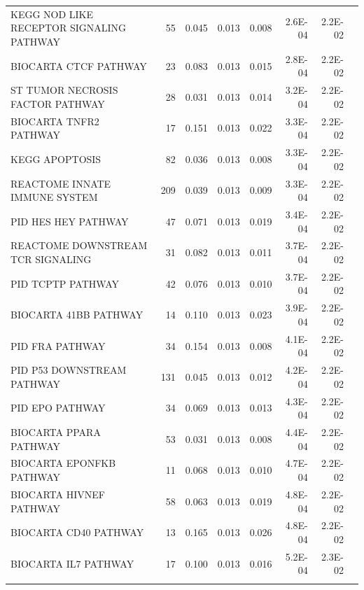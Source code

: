 \documentclass[a4,center,fleqn]{NAR}
\begin{document}
\begin{table}[!ht]
\begin{tabular}{p{3in}rrrrrrr}
			KEGG NOD LIKE RECEPTOR SIGNALING PATHWAY & 55 & 0.045 & 0.013 & 0.008 & 2.6E-04 & 2.2E-02 &  \\ 
			BIOCARTA CTCF PATHWAY & 23 & 0.083 & 0.013 & 0.015 & 2.8E-04 & 2.2E-02 &  \\ 
			ST TUMOR NECROSIS FACTOR PATHWAY & 28 & 0.031 & 0.013 & 0.014 & 3.2E-04 & 2.2E-02 &  \\ 
			BIOCARTA TNFR2 PATHWAY & 17 & 0.151 & 0.013 & 0.022 & 3.3E-04 & 2.2E-02 &  \\ 
			KEGG APOPTOSIS & 82 & 0.036 & 0.013 & 0.008 & 3.3E-04 & 2.2E-02 &  \\ 
			REACTOME INNATE IMMUNE SYSTEM & 209 & 0.039 & 0.013 & 0.009 & 3.3E-04 & 2.2E-02 &  \\ 
			PID HES HEY PATHWAY & 47 & 0.071 & 0.013 & 0.019 & 3.4E-04 & 2.2E-02 &  \\ 
			REACTOME DOWNSTREAM TCR SIGNALING & 31 & 0.082 & 0.013 & 0.011 & 3.7E-04 & 2.2E-02 &  \\ 
			PID TCPTP PATHWAY & 42 & 0.076 & 0.013 & 0.010 & 3.7E-04 & 2.2E-02 &  \\ 
			BIOCARTA 41BB PATHWAY & 14 & 0.110 & 0.013 & 0.023 & 3.9E-04 & 2.2E-02 &  \\ 
			PID FRA PATHWAY & 34 & 0.154 & 0.013 & 0.008 & 4.1E-04 & 2.2E-02 &  \\ 
			PID P53 DOWNSTREAM PATHWAY & 131 & 0.045 & 0.013 & 0.012 & 4.2E-04 & 2.2E-02 &  \\ 
			PID EPO PATHWAY & 34 & 0.069 & 0.013 & 0.013 & 4.3E-04 & 2.2E-02 &  \\ 
			BIOCARTA PPARA PATHWAY & 53 & 0.031 & 0.013 & 0.008 & 4.4E-04 & 2.2E-02 &  \\ 
			BIOCARTA EPONFKB PATHWAY & 11 & 0.068 & 0.013 & 0.010 & 4.7E-04 & 2.2E-02 &  \\ 
			BIOCARTA HIVNEF PATHWAY & 58 & 0.063 & 0.013 & 0.019 & 4.8E-04 & 2.2E-02 &  \\ 
			BIOCARTA CD40 PATHWAY & 13 & 0.165 & 0.013 & 0.026 & 4.8E-04 & 2.2E-02 &  \\ 
			BIOCARTA IL7 PATHWAY & 17 & 0.100 & 0.013 & 0.016 & 5.2E-04 & 2.3E-02 &  \\ 
			\botrule
		\end{tabular}
		\label{table:top30}
	\end{table}
	
	
	
	
	
	
\end{document}
